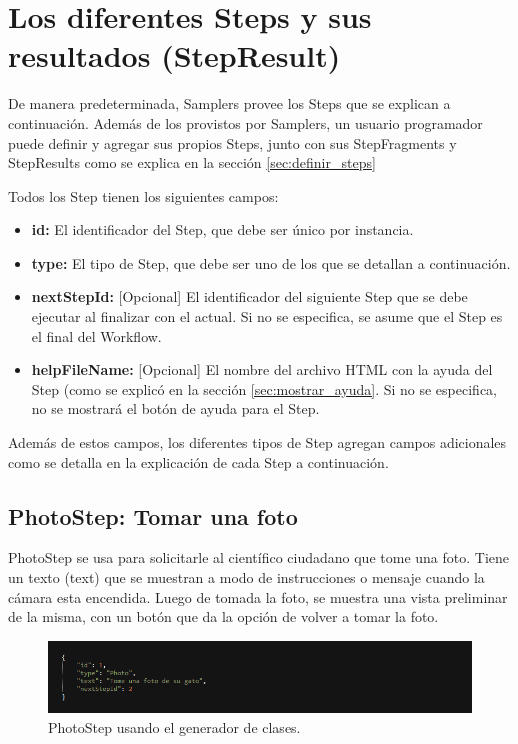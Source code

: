 \section{Los diferentes Steps y sus resultados (StepResult)} \label{sec:steps_detallados}
De manera predeterminada, Samplers provee los Steps que se explican a continuación. Además de los provistos por Samplers, un usuario programador puede definir y agregar sus propios Steps, junto con sus StepFragments y StepResults como se explica en la sección \ref{sec:definir_steps} 

Todos los Step tienen los siguientes campos:

\begin{itemize}
\item \textbf{id:} El identificador del Step, que debe ser único por instancia.
\item \textbf{type:} El tipo de Step, que debe ser uno de los que se detallan a continuación.
\item \textbf{nextStepId:} [Opcional] El identificador del siguiente Step que se debe ejecutar al finalizar con el actual. Si no se especifica, se asume que el Step es el final del Workflow.
\item \textbf{helpFileName:} [Opcional] El nombre del archivo HTML con la ayuda del Step (como se explicó en la sección \ref{sec:mostrar_ayuda}. Si no se especifica, no se mostrará el botón de ayuda para el Step.
\end{itemize}

Además de estos campos, los diferentes tipos de Step agregan campos adicionales como se detalla en la explicación de cada Step a continuación.


\subsection{PhotoStep: Tomar una foto}
PhotoStep se usa para solicitarle al científico ciudadano que tome una foto. Tiene un texto (text) que se muestran a modo de instrucciones o mensaje cuando la cámara esta encendida. Luego de tomada la foto, se muestra una vista preliminar de la misma, con un botón que da la opción de volver a tomar la foto.

\begin{figure}[H]
  \centering
    \includegraphics[scale=0.6]{50-anexos/C-steps/photo_json.png} 
    \caption{PhotoStep usando el generador de clases.}
\end{figure}	

